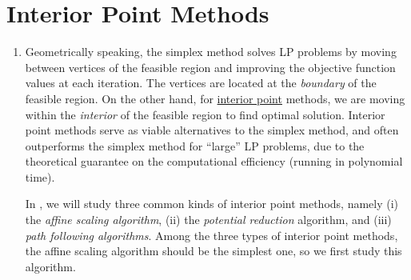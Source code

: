 \section{Interior Point Methods}
\label{sect:int-pt-methods}
\begin{enumerate}
\item Geometrically speaking, the simplex method solves LP problems by moving
between vertices of the feasible region and improving the objective function
values at each iteration. The vertices are located at the \emph{boundary} of the
feasible region. On the other hand, for \underline{interior point} methods, we are moving
within the \emph{interior} of the feasible region to find optimal solution. Interior
point methods serve as viable alternatives to the simplex method, and often
outperforms the simplex method for ``large'' LP problems, due to the theoretical
guarantee on the computational efficiency (running in polynomial time).

In , we will study three common kinds of interior point methods,
namely (i) the \emph{affine scaling algorithm}, (ii) the \emph{potential reduction}
algorithm, and (iii) \emph{path following algorithms}. Among the three types of
interior point methods, the affine scaling algorithm should be the simplest
one, so we first study this algorithm.
\end{enumerate}
